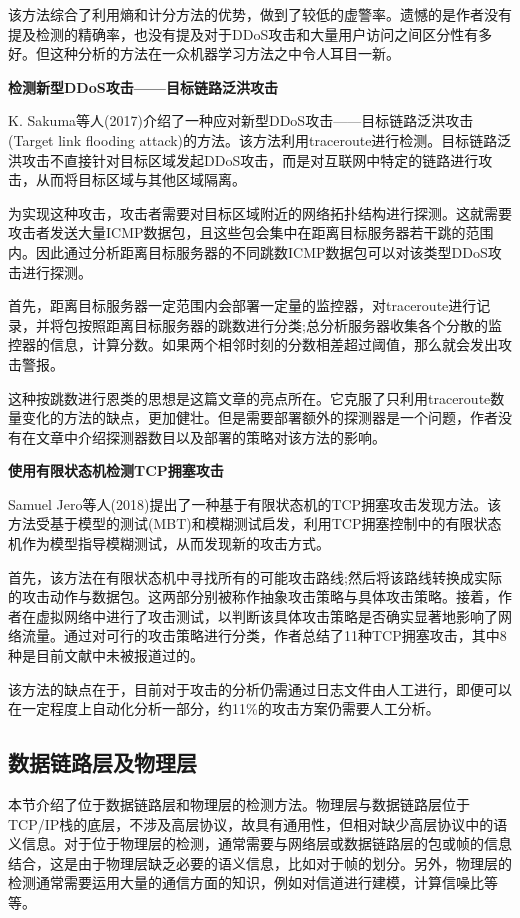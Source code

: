 \documentclass[12pt]{article} %
\begin{document}
该方法综合了利用熵和计分方法的优势，做到了较低的虚警率。遗憾的是作者没有提及检测的精确率，也没有提及对于DDoS攻击和大量用户访问之间区分性有多好。但这种分析的方法在一众机器学习方法之中令人耳目一新。

\textbf{检测新型DDoS攻击——目标链路泛洪攻击}

K. Sakuma等人(2017)\cite{traceroute}介绍了一种应对新型DDoS攻击——目标链路泛洪攻击(Target link flooding attack)的方法。该方法利用traceroute进行检测。目标链路泛洪攻击不直接针对目标区域发起DDoS攻击，而是对互联网中特定的链路进行攻击，从而将目标区域与其他区域隔离。

为实现这种攻击，攻击者需要对目标区域附近的网络拓扑结构进行探测。这就需要攻击者发送大量ICMP数据包，且这些包会集中在距离目标服务器若干跳的范围内。因此通过分析距离目标服务器的不同跳数ICMP数据包可以对该类型DDoS攻击进行探测。%

首先，距离目标服务器一定范围内会部署一定量的监控器，对traceroute进行记录，并将包按照距离目标服务器的跳数进行分类;总分析服务器收集各个分散的监控器的信息，计算分数。如果两个相邻时刻的分数相差超过阈值，那么就会发出攻击警报。

这种按跳数进行恩类的思想是这篇文章的亮点所在。它克服了只利用traceroute数量变化的方法的缺点，更加健壮。但是需要部署额外的探测器是一个问题，作者没有在文章中介绍探测器数目以及部署的策略对该方法的影响。

\textbf{使用有限状态机检测TCP拥塞攻击}

Samuel Jero等人(2018)\cite{fsm}提出了一种基于有限状态机的TCP拥塞攻击发现方法。该方法受基于模型的测试(MBT)和模糊测试启发，利用TCP拥塞控制中的有限状态机作为模型指导模糊测试，从而发现新的攻击方式。

首先，该方法在有限状态机中寻找所有的可能攻击路线;然后将该路线转换成实际的攻击动作与数据包。这两部分别被称作抽象攻击策略与具体攻击策略。接着，作者在虚拟网络中进行了攻击测试，以判断该具体攻击策略是否确实显著地影响了网络流量。通过对可行的攻击策略进行分类，作者总结了11种TCP拥塞攻击，其中8种是目前文献中未被报道过的。

该方法的缺点在于，目前对于攻击的分析仍需通过日志文件由人工进行，即便可以在一定程度上自动化分析一部分，约11\%的攻击方案仍需要人工分析。

\subsection{数据链路层及物理层}
\label{phy}

本节介绍了位于数据链路层和物理层的检测方法。物理层与数据链路层位于TCP/IP栈的底层，不涉及高层协议，故具有通用性，但相对缺少高层协议中的语义信息。对于位于物理层的检测，通常需要与网络层或数据链路层的包或帧的信息结合，这是由于物理层缺乏必要的语义信息，比如对于帧的划分。另外，物理层的检测通常需要运用大量的通信方面的知识，例如对信道进行建模，计算信噪比等等。
\end{document}
